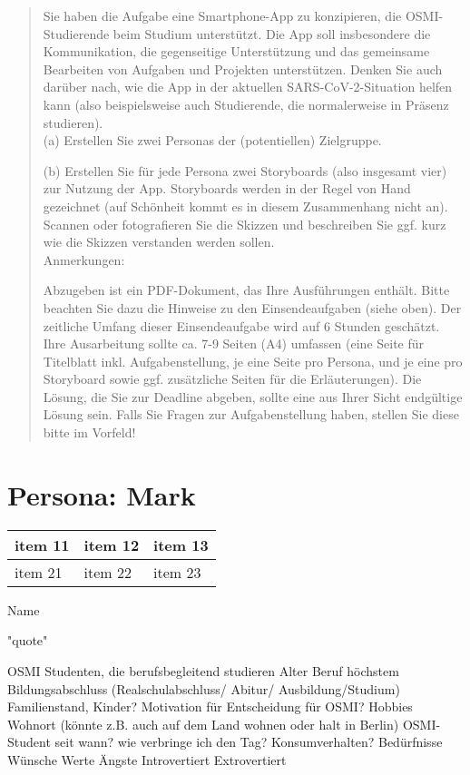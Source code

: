 \documentclass{article}
\begin{document}
\begin{quote}
	Sie haben die Aufgabe eine Smartphone-App zu konzipieren, die OSMI-Studierende beim Studium unterstützt.
	Die App soll insbesondere die Kommunikation, die gegenseitige Unterstützung und das gemeinsame Bearbeiten
	von Aufgaben und Projekten unterstützen. Denken Sie auch darüber nach, wie die App in der aktuellen
	SARS-CoV-2-Situation helfen kann (also beispielsweise auch Studierende, die normalerweise in Präsenz studieren).
	\\[1em]
	(a) Erstellen Sie zwei Personas der (potentiellen) Zielgruppe.

	(b) Erstellen Sie für jede Persona zwei Storyboards (also insgesamt vier) zur Nutzung der App. Storyboards
	werden in der Regel von Hand gezeichnet (auf Schönheit kommt es in diesem Zusammenhang nicht an). Scannen
	oder fotografieren Sie die Skizzen und beschreiben Sie ggf. kurz wie die Skizzen verstanden werden sollen.
	\\[1em]
	Anmerkungen:

	Abzugeben ist ein PDF-Dokument, das Ihre Ausführungen enthält. Bitte beachten Sie dazu die Hinweise zu den
	Einsendeaufgaben (siehe oben). Der zeitliche Umfang dieser Einsendeaufgabe wird auf 6 Stunden geschätzt.
	Ihre Ausarbeitung sollte ca. 7-9 Seiten (A4) umfassen (eine Seite für Titelblatt inkl. Aufgabenstellung,
	je eine Seite pro Persona, und je eine pro Storyboard sowie ggf. zusätzliche Seiten für die Erläuterungen).
	Die Lösung, die Sie zur Deadline abgeben, sollte eine aus Ihrer Sicht endgültige Lösung sein. Falls Sie
	Fragen zur Aufgabenstellung haben, stellen Sie diese bitte im Vorfeld!
\end{quote}

\newpage

\section{Persona: Mark}

\begin{tabularx}{0.8\textwidth} { 
	| >{\raggedright\arraybackslash}X 
	| >{\centering\arraybackslash}X 
	| >{\raggedleft\arraybackslash}X | }
	\hline
	item 11 & item 12 & item 13 \\
	\hline
	item 21  & item 22  & item 23  \\
	\hline
\end{tabularx}

Name

"quote"

OSMI Studenten, die berufsbegleitend studieren
Alter
Beruf höchstem Bildungsabschluss (Realschulabschluss/ Abitur/ Ausbildung/Studium)
Familienstand,
Kinder?
Motivation für Entscheidung für OSMI?
Hobbies
Wohnort (könnte z.B. auch auf dem Land wohnen oder halt in Berlin)
OSMI-Student seit wann?
wie verbringe ich den Tag?
Konsumverhalten?
Bedürfnisse
Wünsche
Werte
Ängste
Introvertiert
Extrovertiert
\end{document}
